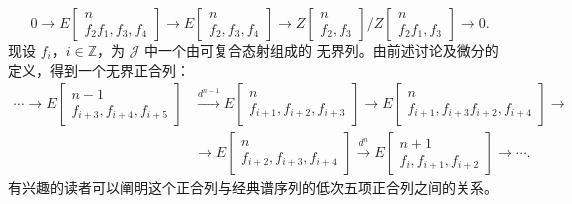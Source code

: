 \clearpage
{}%
\begingroup\small\setlength{\parskip}{0pt}\setlength{\emergencystretch}{2.5em}
\[
0\longrightarrow
E\!\begin{bmatrix}n\\ f_2f_1,f_3,f_4\end{bmatrix}
\longrightarrow
E\!\begin{bmatrix}n\\ f_2,f_3,f_4\end{bmatrix}
\longrightarrow
Z\!\begin{bmatrix}n\\ f_2,f_3\end{bmatrix}
 \Big/
Z\!\begin{bmatrix}n\\ f_2f_1,f_3\end{bmatrix}
\longrightarrow0.
\]
现设 $f_i$，$i\in\mathbb Z$，为 $\mathcal J$ 中一个由可复合态射组成的
无界列。由前述讨论及微分的定义，得到一个无界正合列：
\[
\begin{aligned}
\cdots\longrightarrow
E\!\begin{bmatrix}n-1\\ f_{i+3},f_{i+4},f_{i+5}\end{bmatrix}
&\xrightarrow{d^{n-1}}
E\!\begin{bmatrix}n\\ f_{i+1},f_{i+2},f_{i+3}\end{bmatrix}
\longrightarrow
E\!\begin{bmatrix}n\\ f_{i+1},f_{i+3}f_{i+2},f_{i+4}\end{bmatrix}
\longrightarrow{}\\[-1pt]
&\longrightarrow
E\!\begin{bmatrix}n\\ f_{i+2},f_{i+3},f_{i+4}\end{bmatrix}
\xrightarrow{d^n}
E\!\begin{bmatrix}n+1\\ f_i,f_{i+1},f_{i+2}\end{bmatrix}
\longrightarrow\cdots.
\end{aligned}
\]
有兴趣的读者可以阐明这个正合列与经典谱序列的低次五项正合列之间的关系。

